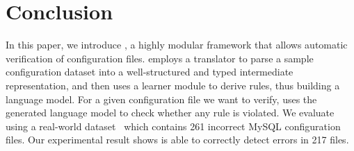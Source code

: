 
\section{Conclusion}

In this paper, we introduce \app, a highly modular framework 
that allows automatic verification of configuration files.
\app employs a translator to parse a sample configuration dataset
into a well-structured and typed intermediate representation,
and then uses a learner module to derive rules, 
thus building a language model.
For a given configuration file we want to verify,
\app uses the generated language model to check
whether any rule is violated.
We evaluate \app using a real-world dataset~\cite{configdataset}
which contains 261 incorrect MySQL configuration files.
Our experimental result shows \app is able to
correctly detect errors in 217 files.

